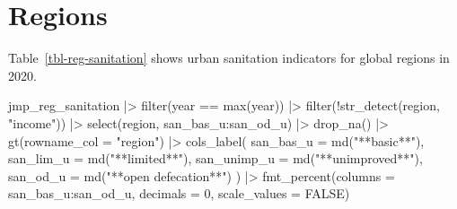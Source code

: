 \documentclass[
  letterpaper,
  DIV=11,
  numbers=noendperiod]{scrartcl}
\newenvironment{Shaded}{\begin{snugshade}}{\end{snugshade}}
\newcommand{\AttributeTok}[1]{\textcolor[rgb]{0.40,0.45,0.13}{#1}}
\newcommand{\ConstantTok}[1]{\textcolor[rgb]{0.56,0.35,0.01}{#1}}
\newcommand{\DecValTok}[1]{\textcolor[rgb]{0.68,0.00,0.00}{#1}}
\newcommand{\FunctionTok}[1]{\textcolor[rgb]{0.28,0.35,0.67}{#1}}
\newcommand{\NormalTok}[1]{\textcolor[rgb]{0.00,0.23,0.31}{#1}}
\newcommand{\SpecialCharTok}[1]{\textcolor[rgb]{0.37,0.37,0.37}{#1}}
\newcommand{\StringTok}[1]{\textcolor[rgb]{0.13,0.47,0.30}{#1}}
\begin{document}
\hypertarget{regions}{%
\section{Regions}\label{regions}}

Table~\ref{tbl-reg-sanitation} shows urban sanitation indicators for
global regions in 2020.

\begin{Shaded}
\begin{Highlighting}[]
\NormalTok{jmp\_reg\_sanitation }\SpecialCharTok{|\textgreater{}} 
  \FunctionTok{filter}\NormalTok{(year }\SpecialCharTok{==} \FunctionTok{max}\NormalTok{(year)) }\SpecialCharTok{|\textgreater{}} 
  \FunctionTok{filter}\NormalTok{(}\SpecialCharTok{!}\FunctionTok{str\_detect}\NormalTok{(region, }\StringTok{"income"}\NormalTok{)) }\SpecialCharTok{|\textgreater{}} 
  \FunctionTok{select}\NormalTok{(region, san\_bas\_u}\SpecialCharTok{:}\NormalTok{san\_od\_u) }\SpecialCharTok{|\textgreater{}} 
  \FunctionTok{drop\_na}\NormalTok{() }\SpecialCharTok{|\textgreater{}} 
  \FunctionTok{gt}\NormalTok{(}\AttributeTok{rowname\_col =} \StringTok{"region"}\NormalTok{) }\SpecialCharTok{|\textgreater{}} 
  \FunctionTok{cols\_label}\NormalTok{(}
    \AttributeTok{san\_bas\_u =} \FunctionTok{md}\NormalTok{(}\StringTok{"**basic**"}\NormalTok{),}
    \AttributeTok{san\_lim\_u =} \FunctionTok{md}\NormalTok{(}\StringTok{"**limited**"}\NormalTok{),}
    \AttributeTok{san\_unimp\_u =} \FunctionTok{md}\NormalTok{(}\StringTok{"**unimproved**"}\NormalTok{),}
    \AttributeTok{san\_od\_u =} \FunctionTok{md}\NormalTok{(}\StringTok{"**open defecation**"}\NormalTok{)}
\NormalTok{  ) }\SpecialCharTok{|\textgreater{}} 
  \FunctionTok{fmt\_percent}\NormalTok{(}\AttributeTok{columns =}\NormalTok{ san\_bas\_u}\SpecialCharTok{:}\NormalTok{san\_od\_u,}
              \AttributeTok{decimals =} \DecValTok{0}\NormalTok{, }
              \AttributeTok{scale\_values =} \ConstantTok{FALSE}\NormalTok{) }
\end{Highlighting}
\end{Shaded}
\end{document}
